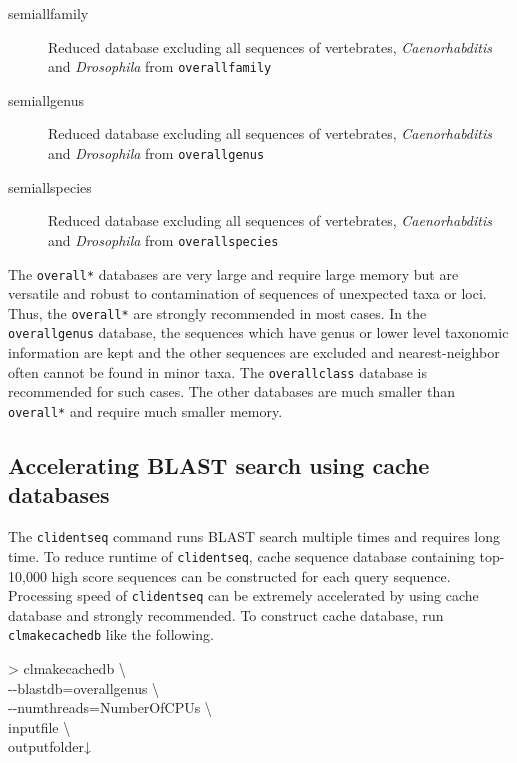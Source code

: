 \documentclass[titlepage,10pt,a4paper,english]{jsbook}
\newenvironment{cmd}{\begin{oframed}\raggedright\ttfamily\footnotesize\setlength{\baselineskip}{1.4em}}{\end{oframed}\vspace{-1em}}
\begin{document}
\begin{description}
\item[semiall{\textunderscore}family] Reduced database excluding all sequences of vertebrates, \textit{Caenorhabditis} and \textit{Drosophila} from \texttt{overall{\textunderscore}family}
\item[semiall{\textunderscore}genus] Reduced database excluding all sequences of vertebrates, \textit{Caenorhabditis} and \textit{Drosophila} from \texttt{overall{\textunderscore}genus}
\item[semiall{\textunderscore}species] Reduced database excluding all sequences of vertebrates, \textit{Caenorhabditis} and \textit{Drosophila} from \texttt{overall{\textunderscore}species}
\end{description}

The \texttt{overall{\textunderscore}*} databases are very large and require large memory but are versatile and robust to contamination of sequences of unexpected taxa or loci.
Thus, the \texttt{overall{\textunderscore}*} are strongly recommended in most cases.
In the \texttt{overall{\textunderscore}genus} database, the sequences which have genus or lower level taxonomic information are kept and the other sequences are excluded and nearest-neighbor often cannot be found in minor taxa.
The \texttt{overall{\textunderscore}class} database is recommended for such cases.
The other databases are much smaller than \texttt{overall{\textunderscore}*} and require much smaller memory.

\subsection{Accelerating BLAST search using cache databases}

The \texttt{clidentseq} command runs BLAST search multiple times and requires long time.
To reduce runtime of \texttt{clidentseq}, cache sequence database containing top-10,000 high score sequences can be constructed for each query sequence.
Processing speed of \texttt{clidentseq} can be extremely accelerated by using cache database and strongly recommended.
To construct cache database, run \texttt{clmakecachedb} like the following.

\begin{cmd}
{\textgreater} clmakecachedb {\textbackslash}\\
{-}{-}blastdb=overall{\textunderscore}genus {\textbackslash}\\
{-}{-}numthreads=NumberOfCPUs {\textbackslash}\\
inputfile {\textbackslash}\\
outputfolder↓
\end{cmd}
\end{document}
